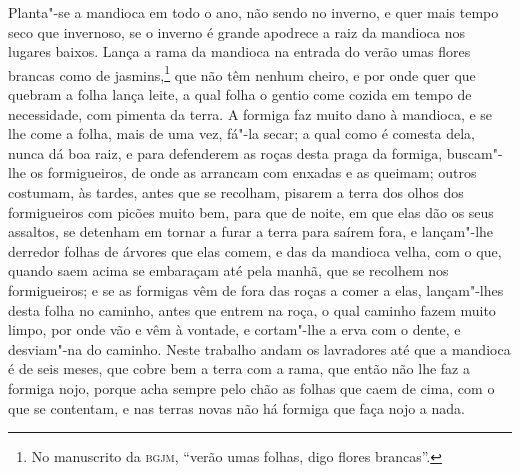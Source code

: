 Planta"-se a mandioca em todo o ano, não sendo no inverno, e quer mais tempo seco que
invernoso, se o inverno é grande apodrece a raiz da mandioca nos lugares baixos. Lança a
rama da mandioca na entrada do verão umas flores brancas como de jasmins,\footnote{ No
manuscrito da \textsc{bgjm}, ``verão umas folhas, digo flores brancas''.} que não têm
nenhum cheiro, e por onde quer que quebram a folha lança leite, a qual folha o gentio come
cozida em tempo de necessidade, com pimenta da terra. A formiga faz muito dano à mandioca,
e se lhe come a folha, mais de uma vez, fá"-la secar; a qual como é comesta dela, nunca dá
boa raiz, e para defenderem as roças desta praga da formiga, buscam"-lhe os formigueiros,
de onde as arrancam com enxadas e as queimam; outros costumam, às tardes, antes que se
recolham, pisarem a terra dos olhos dos formigueiros com picões muito bem, para que de
noite, em que elas dão os seus assaltos, se detenham em tornar a furar a terra para saírem
fora, e lançam"-lhe derredor folhas de árvores que elas comem, e das da mandioca velha, com
o que, quando saem acima se embaraçam até pela manhã, que se recolhem nos formigueiros; e
se as formigas vêm de fora das roças a comer a elas, lançam"-lhes desta folha no caminho,
antes que entrem na roça, o qual caminho fazem muito limpo, por onde vão e vêm à vontade,
e cortam"-lhe a erva com o dente, e desviam"-na do caminho. Neste trabalho andam os
lavradores até que a mandioca é de seis meses, que cobre bem a terra com a rama, que então
não lhe faz a formiga nojo, porque acha sempre pelo chão as folhas que caem de cima, com o
que se contentam, e nas terras novas não há formiga que faça nojo a nada.

